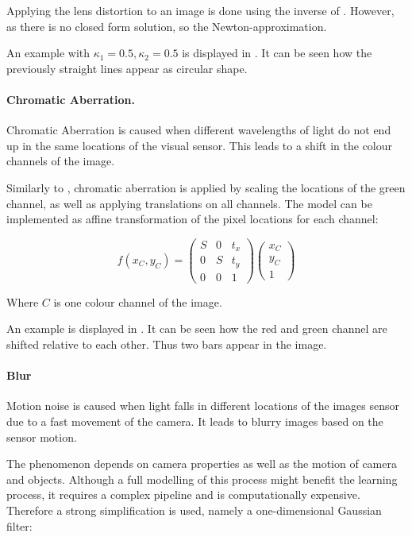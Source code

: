 Applying the lens distortion to an image is done using the inverse of . However, as there is no closed form solution, so the Newton-approximation.

An example with $\kappa_1 = 0.5, \kappa_2 = 0.5$ is displayed in . It can be seen how the previously straight lines appear as circular shape.

\paragraph{Chromatic Aberration.}

Chromatic Aberration is caused when different wavelengths of light do not end up in the same locations of the visual sensor. This leads to a shift in the colour channels of the image.

Similarly to \cite{Carlson2018}, chromatic aberration is applied by scaling the locations of the green channel, as well as applying translations on all channels. The model can be implemented as affine transformation of the pixel locations for each channel:

\begin{equation}
f(x_C,y_C) = \begin{pmatrix}
S & 0 & t_x \\
0 & S & t_y \\
0 & 0 & 1
\end{pmatrix} \begin{pmatrix}
x_C \\
y_C \\
1
\end{pmatrix}
\end{equation}

Where $C$ is one colour channel of the image.

An example is displayed in . It can be seen how the red and green channel are shifted relative to each other. Thus two bars appear in the image.

\paragraph{Blur}

Motion noise is caused when light falls in different locations of the images sensor due to a fast movement of the camera. It leads to blurry images based on the sensor motion.

The phenomenon depends on camera properties as well as the motion of camera and objects. Although a full modelling of this process might benefit the learning process, it requires a complex pipeline and is computationally expensive. Therefore a strong simplification is used, namely a one-dimensional Gaussian filter:


